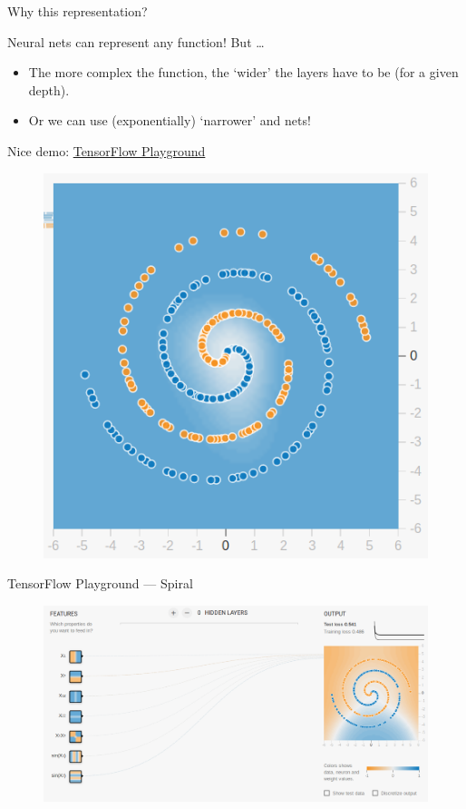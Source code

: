 \documentclass[lualatex, aspectratio=169]{beamer}
\begin{document}
\begin{frame}{Why this representation?}

  Neural nets can represent any function! But \ldots
  \begin{itemize}
    \item The more complex the function, the `wider' the layers have to be (for a given depth).
    \item Or we can use (exponentially) `narrower' and  nets!
  \end{itemize}

  Nice demo: \href{https://playground.tensorflow.org}{TensorFlow Playground}
  \begin{figure}
    \includegraphics[width=0.2\pagewidth]{assets/swirl.png}
  \end{figure}


\end{frame}


\begin{frame}{TensorFlow Playground --- Spiral}

  \begin{figure}
    \centering
    \includegraphics[height=0.75\pageheight]{assets/0-hidden.png}
  \end{figure}

\end{frame}
\end{document}
